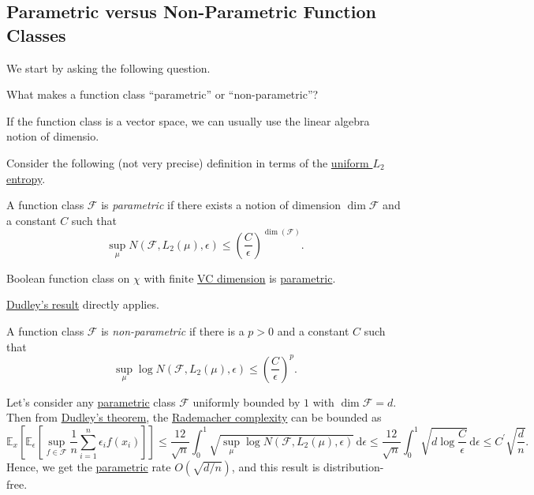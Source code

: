 \subsection{Parametric versus Non-Parametric Function Classes}
We start by asking the following question.

\begin{problem*}
	What makes a function class ``parametric'' or ``non-parametric''?
\end{problem*}
\begin{answer}
	If the function class is a vector space, we can usually use the linear algebra notion of dimensio.
\end{answer}

Consider the following (not very precise) definition in terms of the \hyperref[def:Koltchinskii-Pollard-entropy]{uniform \(L_2\) entropy}.

\begin{definition}[Parametric]\label{def:parametric}
	A function class \(\mathscr{F} \) is \emph{parametric} if there exists a notion of dimension \(\dim \mathscr{F} \) and a constant \(C\) such that
	\[
		\sup _\mu N(\mathscr{F} , L_2(\mu ), \epsilon ) \leq \left( \frac{C}{\epsilon } \right) ^{\dim(\mathscr{F} )}.
	\]
\end{definition}

\begin{eg}
	Boolean function class on \(\chi \) with finite \hyperref[def:VC-dimension]{VC dimension} is \hyperref[def:parametric]{parametric}.
\end{eg}
\begin{explanation}
	\hyperref[thm:Dudley]{Dudley's result} directly applies.
\end{explanation}

\begin{definition}\label{def:non-parametric}
	A function class \(\mathscr{F} \) is \emph{non-parametric} if there is a \(p > 0\) and a constant \(C\) such that
	\[
		\sup _\mu \log N(\mathscr{F} , L_2(\mu ), \epsilon ) \leq \left( \frac{C}{\epsilon } \right) ^p.
	\]
\end{definition}

Let's consider any \hyperref[def:parametric]{parametric} class \(\mathscr{F} \) uniformly bounded by \(1\) with \(\dim \mathscr{F} = d\). Then from \hyperref[thm:Dudley]{Dudley's theorem}, the \hyperref[def:Rademacher-complexity]{Rademacher complexity} can be bounded as
\[
	\mathbb{E}_{x}\left[\mathbb{E}_{\epsilon }\left[\sup _{f\in \mathscr{F} } \frac{1}{n}\sum_{i=1}^{n} \epsilon _i f(x_i) \right]  \right]
	\leq \frac{12}{\sqrt{n} } \int_{0}^{1} \sqrt{\sup _\mu \log N(\mathscr{F} , L_2(\mu ), \epsilon )} \,\mathrm{d}\epsilon
	\leq \frac{12}{\sqrt{n} } \int_{0}^{1} \sqrt{d \log \frac{C}{\epsilon }} \,\mathrm{d}\epsilon
	\leq C^{\prime} \sqrt{\frac{d}{n}}.
\]
Hence, we get the \hyperref[def:parametric]{parametric} rate \(O(\sqrt{d / n} )\), and this result is distribution-free.

